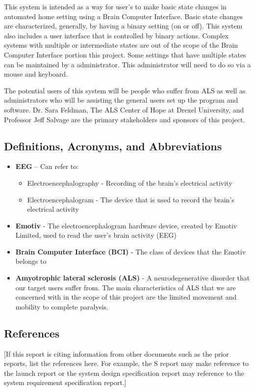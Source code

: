\documentclass{report}
\begin{document}
This system is intended as a way for user's to make basic state changes in automated home setting
using a Brain Computer Interface. Basic state changes are characterized, generally, by having a binary 
setting (on or off). This system also includes a user interface that is controlled by binary actions. Complex 
systems with multiple or intermediate states are out of the scope of the Brain Computer Interface portion 
this project. Some settings that have multiple states can be maintained by a administrator. This 
administrator will need to do so via a mouse and keyboard. 

The potential users of this system will be people who suffer from ALS as well as administrators 
who will be assisting the general users set up the program and software. Dr. Sara Feldman, The ALS 
Center of Hope at Drexel University, and Professor Jeff Salvage are the primary stakeholders and 
sponsors of this project.

\subsection{Definitions, Acronyms, and Abbreviations}
\begin{itemize}
\item \textbf{EEG} – Can refer to:
\begin{itemize}
	\item Electroencephalography - Recording of the brain's electrical activity 
	\item Electroencephalogram - The device that is used to record the brain's electrical activity
\end{itemize}
\item \textbf{Emotiv} - The electroencephalogram hardware device, created by Emotiv Limited, used to read the user's 
brain activity (EEG)
\item \textbf{Brain Computer Interface (BCI)} - The class of devices that the Emotiv belongs to
\item \textbf{Amyotrophic lateral sclerosis (ALS)} - A neurodegenerative disorder that our target users suffer from. 
The main characteristics of ALS that we are concerned with in the scope of this project are the limited 
movement and mobility to complete paralysis.
\end{itemize}
\subsection{References}
[If this report is citing information from other documents such as the prior reports, list the references here. 
For example, the S report may make reference to the launch report or the system design specification 
report may reference to the system requirement specification report.]
\end{document}
